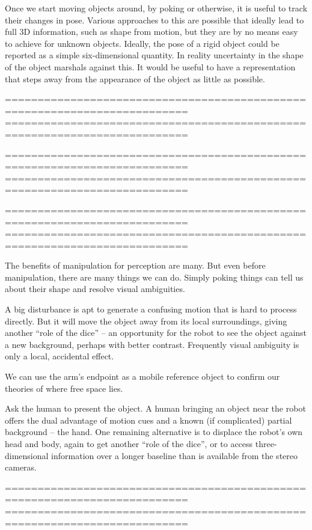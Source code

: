 Once we start moving objects around, by poking or otherwise, it is
useful to track their changes in pose.  Various approaches to this are
possible that ideally lead to full 3D information, such as shape from
motion, but they are by no means easy to achieve for unknown objects.
Ideally, the pose of a rigid object could be reported as a simple
six-dimensional quantity.  In reality uncertainty in the shape of the
object marshals against this.  
It would be useful to have a
representation that steps away from the appearance of the object as
little as possible.  

==========================================================================
==========================================================================


==========================================================================
==========================================================================


==========================================================================
==========================================================================



The benefits of manipulation for perception are many.  But even before
manipulation, there are many things we can do.  Simply poking things
can tell us about their shape and resolve visual ambiguities.


A big disturbance is apt to generate
  a confusing motion that is hard to process directly.  But it will
  move the object away from its local surroundings, giving another
  ``role of the dice'' -- an opportunity for the robot to see the
  object against a new background, perhaps with better contrast.
  Frequently visual ambiguity is only a local, accidental effect.

  We can use the arm's endpoint as a mobile
  reference object to confirm our theories of where free space lies.

Ask the human to present the object.  A human bringing an
object near the robot offers the dual advantage of motion cues and
a known (if complicated) partial background -- the hand.
%
One remaining alternative is to displace the robot's own head and body, again
to get another ``role of the dice'', or to access three-dimensional
information over a longer baseline than is available from the
stereo cameras.
%


==========================================================================
==========================================================================



